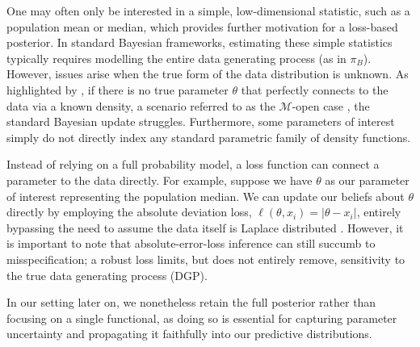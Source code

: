 \documentclass[mstat,12pt]{unswthesis}
\begin{document}
One may often only be interested in a simple, low-dimensional statistic, such as a population mean or median, which provides further motivation for a loss-based posterior.
In standard Bayesian frameworks, estimating these simple statistics typically requires modelling the entire data generating process (as in $\pi_B$).
However, issues arise when the true form of the data distribution is unknown. As highlighted by \citet{bissiri2016general}, if there is no true parameter $\theta$ that perfectly connects to the data via a known density, a scenario referred to as the $\mathcal{M}$-open case \cite{bernardo1994bayesian}, the standard Bayesian update struggles. Furthermore, some parameters of interest simply do not directly index any standard parametric family of density functions.

Instead of relying on a full probability model, a loss function can connect a parameter to the data directly. For example, suppose we have $\theta$ as our parameter of interest representing the population median. We can update our beliefs about $\theta$ directly by employing the absolute deviation loss, $\ell(\theta, x_i) = |\theta - x_i|$, entirely bypassing the need to assume the data itself is Laplace distributed \cite{bissiri2016general}. However, it is important to note that absolute-error-loss inference can still succumb to misspecification; a robust loss limits, but does not entirely remove, sensitivity to the true data generating process (DGP).

In our setting later on, we nonetheless retain the full posterior rather than focusing on a single functional, as doing so is essential for capturing parameter uncertainty and propagating it faithfully into our predictive distributions.


\vspace{1.5em}
\end{document}
